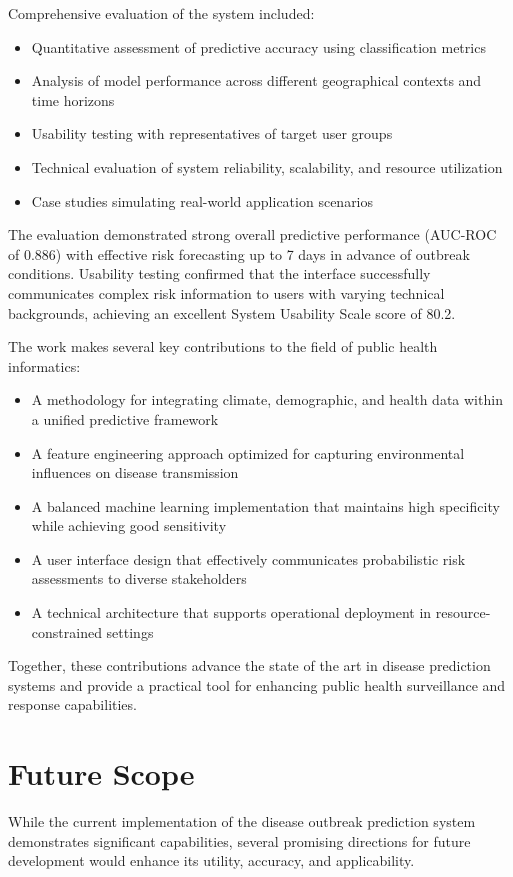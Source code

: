 \documentclass[12pt,a4paper]{report}
\begin{document}
Comprehensive evaluation of the system included:
\begin{itemize}
    \item Quantitative assessment of predictive accuracy using classification metrics
    \item Analysis of model performance across different geographical contexts and time horizons
    \item Usability testing with representatives of target user groups
    \item Technical evaluation of system reliability, scalability, and resource utilization
    \item Case studies simulating real-world application scenarios
\end{itemize}

The evaluation demonstrated strong overall predictive performance (AUC-ROC of 0.886) with effective risk forecasting up to 7 days in advance of outbreak conditions. Usability testing confirmed that the interface successfully communicates complex risk information to users with varying technical backgrounds, achieving an excellent System Usability Scale score of 80.2.

The work makes several key contributions to the field of public health informatics:
\begin{itemize}
    \item A methodology for integrating climate, demographic, and health data within a unified predictive framework
    \item A feature engineering approach optimized for capturing environmental influences on disease transmission
    \item A balanced machine learning implementation that maintains high specificity while achieving good sensitivity
    \item A user interface design that effectively communicates probabilistic risk assessments to diverse stakeholders
    \item A technical architecture that supports operational deployment in resource-constrained settings
\end{itemize}

Together, these contributions advance the state of the art in disease prediction systems and provide a practical tool for enhancing public health surveillance and response capabilities.

\section{Future Scope}
While the current implementation of the disease outbreak prediction system demonstrates significant capabilities, several promising directions for future development would enhance its utility, accuracy, and applicability.
\end{document}
